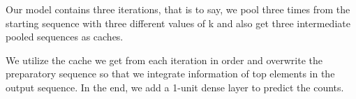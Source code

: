 Our model contains three iterations, that is to say, we pool three times from the starting sequence with three different values of k and also get three intermediate pooled sequences as caches.

We utilize the cache we get from each iteration in order and overwrite the preparatory sequence so that  we integrate information of top elements in the output sequence. In the end, we add a 1-unit dense layer to predict the counts.
